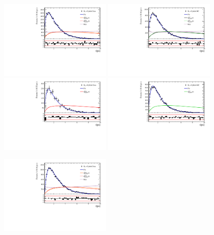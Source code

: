 \clearpage
\begin{figure}[h]
\includegraphics[height=!,width=0.49\textwidth]{figs/Acceptance/adaptive_N4/timeAccRatioFit_norm_Run2_t0.pdf}
\includegraphics[height=!,width=0.49\textwidth]{figs/Acceptance/adaptive_N4/timeAccRatioFit_norm_mc_Run2_t0.pdf}
\includegraphics[height=!,width=0.49\textwidth]{figs/Acceptance/adaptive_N4/timeAccRatioFit_signal_B0_Run2_t0.pdf}
\includegraphics[height=!,width=0.49\textwidth]{figs/Acceptance/adaptive_N4/timeAccRatioFit_signal_mc_Run2_t0.pdf}
\caption{}
\label{fig:}
\includegraphics[height=!,width=0.49\textwidth]{figs/Acceptance/adaptive_N4/timeAccRatioFit_norm_Run2_t1.pdf}

\end{figure}
